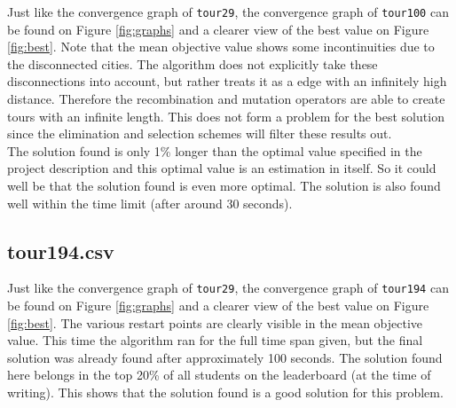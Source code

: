 \documentclass[a4paper,10pt]{article}
\newcommand{\ReplaceMe}[1]{{\color{blue}#1}}
\begin{document}
%
%

Just like the convergence graph of \texttt{tour29}, the convergence graph of \texttt{tour100} can be found on Figure \ref{fig:graphs} and a clearer view of the best value on Figure \ref{fig:best}. Note that the mean objective value shows some incontinuities due to the disconnected cities. The algorithm does not explicitly take these disconnections into account, but rather treats it as a edge with an infinitely high distance. Therefore the recombination and mutation operators are able to create tours with an infinite length. This does not form a problem for the best solution since the elimination and selection schemes will filter these results out.\\
The solution found is only 1\% longer than the optimal value specified in the project description and this optimal value is an estimation in itself. So it could well be that the solution found is even more optimal. The solution is also found well within the time limit (after around 30 seconds). 

\subsection{tour194.csv}

%
%

Just like the convergence graph of \texttt{tour29}, the convergence graph of \texttt{tour194} can be found on Figure \ref{fig:graphs} and a clearer view of the best value on Figure \ref{fig:best}. The various restart points are clearly visible in the mean objective value. This time the algorithm ran for the full time span given, but the final solution was already found after approximately 100 seconds. The solution found here belongs in the top 20\% of all students on the leaderboard (at the time of writing). This shows that the solution found is a good solution for this problem.
\end{document}
